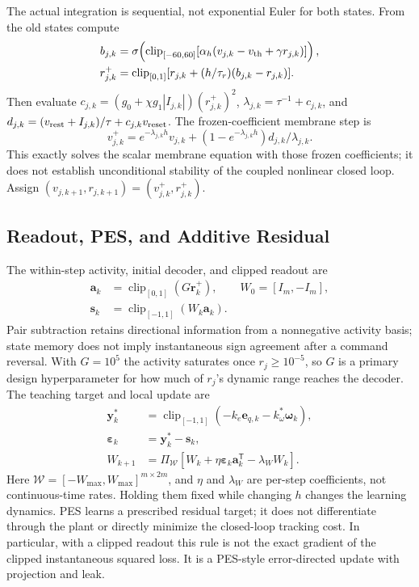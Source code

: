\documentclass[letterpaper, 10 pt, conference]{ieeeconf}
\newcommand{\T}{^{\mathsf T}}
\newcommand{\clip}{\operatorname{clip}}
\begin{document}
The actual integration is sequential, not exponential Euler for both
states. From the old states compute
\begin{align}
 b_{j,k}&=\sigma\!\left(\clip_{[-60,60]}
       [\alpha_h(v_{j,k}-v_{\rm th}+\gamma r_{j,k})]\right),\\
 r_{j,k}^{+}&=\clip_{[0,1]}
       [r_{j,k}+(h/\tau_r)(b_{j,k}-r_{j,k})].
 \label{eq:gate_step}
\end{align}
Then evaluate $c_{j,k}=(g_0+\chi g_1|I_{j,k}|)(r_{j,k}^{+})^2$,
$\lambda_{j,k}=\tau^{-1}+c_{j,k}$, and
$d_{j,k}=(v_{\rm rest}+I_{j,k})/\tau+c_{j,k}v_{\rm reset}$. The
frozen-coefficient membrane step is
\begin{equation}
 v_{j,k}^{+}=e^{-\lambda_{j,k}h}v_{j,k}
       +(1-e^{-\lambda_{j,k}h})d_{j,k}/\lambda_{j,k}.
 \label{eq:mem_step}
\end{equation}
This exactly solves the scalar membrane equation with those frozen
coefficients; it does not establish unconditional stability of the coupled
nonlinear closed loop. Assign $(v_{j,k+1},r_{j,k+1})=(v_{j,k}^{+},r_{j,k}^{+})$.

\subsection{Readout, PES, and Additive Residual}
The within-step activity, initial decoder, and clipped readout are
\begin{equation}
 \begin{aligned}
 \bm a_k&=\clip_{[0,1]}(G\bm r_k^+),\qquad W_0=[I_m,-I_m],\\
 \bm s_k&=\clip_{[-1,1]}(W_k\bm a_k).
 \end{aligned}
 \label{eq:readout}
\end{equation}
Pair subtraction retains directional information from a nonnegative
activity basis; state memory does not imply instantaneous sign agreement
after a command reversal. With $G=10^5$ the activity saturates once
$r_j\ge10^{-5}$, so $G$ is a primary design hyperparameter for how much of
$r_j$'s dynamic range reaches the decoder. The teaching target and local update are
\begin{align}
 \bm y_k^*&=\clip_{[-1,1]}(-k_e\bm e_{q,k}-k_\omega^*\bm\omega_k),\\
 \bm\varepsilon_k&=\bm y_k^*-\bm s_k,\\
 W_{k+1}&=\Pi_{\mathcal W}
       [W_k+\eta\bm\varepsilon_k\bm a_k\T-\lambda_W W_k].
 \label{eq:pes}
\end{align}
Here $\mathcal W=[-W_{\max},W_{\max}]^{m\times2m}$, and
$\eta$ and $\lambda_W$ are per-step coefficients, not continuous-time
rates. Holding them fixed while changing $h$ changes the learning dynamics.
PES learns a prescribed residual target; it does not differentiate through
the plant or directly minimize the closed-loop tracking cost. In particular,
with a clipped readout this rule is not the exact gradient of the clipped
instantaneous squared loss. It is a PES-style error-directed update with
projection and leak.
\end{document}
